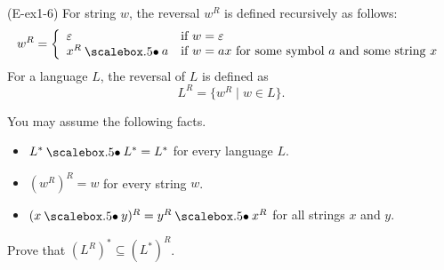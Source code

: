 \begin{frame}

(E-ex1-6) For string $w$, the reversal $w^R$ is defined recursively as follows:
\[
w^R=\left\{
\begin{array}{ll}
  \varepsilon & \mbox{if $w=\varepsilon$} \\
  x^R\sbullet a & \mbox{if $w=ax$ for some symbol $a$ and some string $x$}
\end{array}
\right.
\]
For a language $L$, the reversal of $L$ is defined as
\[
L^R = \{ w^R \;|\; w\in L\}.
\]

You may assume the following facts.
\begin{itemize}
\item $L^*\sbullet L^*=L^*$ for every language $L$.
\item $(w^R)^R=w$ for every string $w$.
\item $(x\sbullet y)^R=y^R\sbullet x^R$ for all strings $x$ and $y$.
\end{itemize}

\end{frame}

\begin{frame}

Prove that $(L^R)^*\subseteq (L^*)^R$.

\vspace{3in}
\end{frame}
